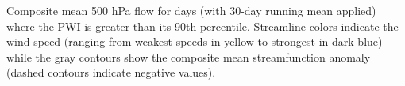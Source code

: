 \label{fig:pwi_spatial_summary}
Composite mean 500 hPa flow for days (with 30-day running mean applied) where the PWI is greater than its 90th percentile. Streamline colors indicate the wind speed (ranging from weakest speeds in yellow to strongest in dark blue) while the gray contours show the composite mean streamfunction anomaly (dashed contours indicate negative values). 